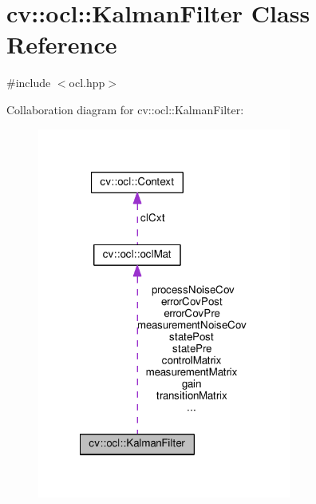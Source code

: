 \hypertarget{classcv_1_1ocl_1_1KalmanFilter}{\section{cv\-:\-:ocl\-:\-:Kalman\-Filter Class Reference}
\label{classcv_1_1ocl_1_1KalmanFilter}
}


{\ttfamily \#include $<$ocl.\-hpp$>$}



Collaboration diagram for cv\-:\-:ocl\-:\-:Kalman\-Filter\-:\nopagebreak
\begin{figure}[H]
\begin{center}
\leavevmode
\includegraphics[width=236pt]{classcv_1_1ocl_1_1KalmanFilter__coll__graph}
\end{center}
\end{figure}
